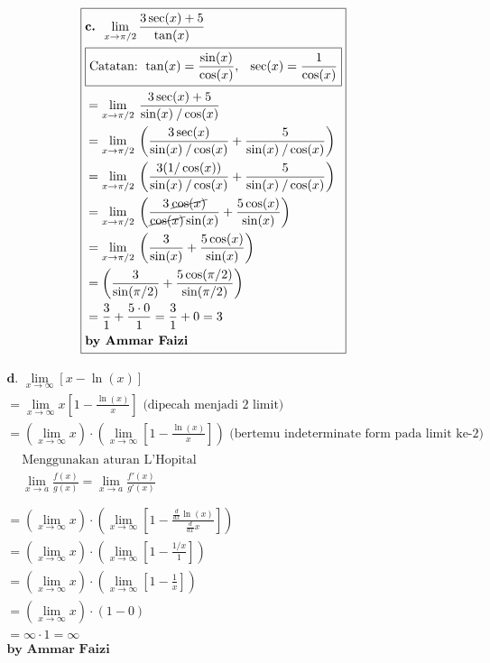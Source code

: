 \documentclass[12pt]{article}
\begin{document}
\begin{fleqn}[1em]
\begin{align*}
\boxed{
\begin{aligned}
  & \textbf{c. } \lim_{x \to \pi/2} \frac{3 \sec(x) + 5}{\tan(x)} \\
  & \boxed{\text{Catatan: } \tan(x) = \frac{\sin(x)}{\cos(x)},\:~\:\sec(x) = \frac{1}{\cos(x)}} \\
  & = \lim_{x \to \pi/2}\:\frac{3 \sec(x) + 5}{\sin(x)\:/\cos(x)} \\
  & = \lim_{x \to \pi/2}\:\left(\frac{3 \sec(x)}{\sin(x)\:/\cos(x)} + \frac{5}{\sin(x)\:/\cos(x)}\right)\\
  & = \lim_{x \to \pi/2}\:\left(\frac{3(1/\cos(x))}{\sin(x)\:/\cos(x)} + \frac{5}{\sin(x)\:/\cos(x)}\right)\\
  & = \lim_{x \to \pi/2}\:\left(\frac{3\:\cancel{\cos(x)}}{\cancel{\cos(x)}\sin(x)} + \frac{5\cos(x)}{\sin(x)}\right) \\
  & = \lim_{x \to \pi/2}\:\left(\frac{3}{\sin(x)} + \frac{5\cos(x)}{\sin(x)}\right) \\
  & = \left(\frac{3}{\sin(\pi/2)} + \frac{5\cos(\pi/2)}{\sin(\pi/2)}\right) \\
  & = \frac{3}{1} + \frac{5 \cdot 0}{1} = \frac{3}{1} + 0 = 3
  \\ & \textbf{by Ammar Faizi}
\end{aligned}
}
\end{align*}


\begin{align*}
\boxed{
\begin{aligned}
  & \textbf{d. } \lim_{x \to \infty} [x - \ln(x)] \\
  & = \lim _{x\to \infty}x\left[1-\frac{\ln \left(x\right)}{x}\right] \text{ (dipecah menjadi 2 limit)} \\
  & = \left(\lim _{x\to \infty}x\right) \cdot \left(\lim_{x\to \infty}\left[1 - \frac{\ln(x)}{x}\right]\right) \text{ (bertemu indeterminate form pada limit ke-2)}\\
  & \boxed{
    \begin{aligned}
      & \text{Menggunakan aturan L'Hopital} \\
      & \lim_{x \to a} \frac{f(x)}{g(x)} = \lim_{x \to a} \frac{f'(x)}{g'(x)} \\
    \end{aligned}
  } \\
  & = \left(\lim _{x\to \infty}x\right) \cdot \left(\lim_{x\to \infty}\left[1 - \frac{\frac{d}{dx}\ln(x)}{\frac{d}{dx}x}\right]\right) \\
  & = \left(\lim _{x\to \infty}x\right) \cdot \left(\lim_{x\to \infty}\left[1 - \frac{1/x}{1}\right]\right) \\
  & = \left(\lim _{x\to \infty}x\right) \cdot \left(\lim_{x\to \infty}\left[1 - \frac{1}{x}\right]\right) \\
  & = \left(\lim _{x\to \infty}x\right) \cdot (1 - 0) \\
  & = \infty \cdot 1 = \infty
  \\ & \textbf{by Ammar Faizi}
\end{aligned}
}
\end{align*}



\end{fleqn}
\end{document}
